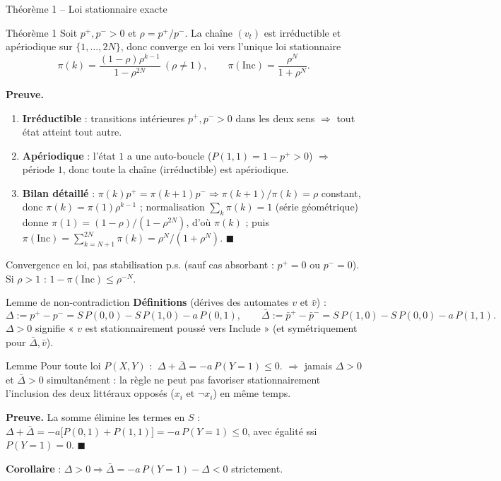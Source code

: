 \documentclass[10pt,aspectratio=169]{beamer}
\newcommand{\Inc}{\ensuremath{\mathrm{Inc}}}
\begin{document}
\begin{frame}{Théorème 1 -- Loi stationnaire exacte}
\begin{block}{Théorème 1}
\footnotesize
Soit $p^+,p^->0$ et $\rho=p^+/p^-$. La chaîne $(v_t)$ est irréductible et
apériodique sur $\{1,\ldots,2N\}$, donc converge en loi vers l'unique loi
stationnaire
\[
  \pi(k) = \frac{(1-\rho)\rho^{k-1}}{1-\rho^{2N}}\ (\rho\ne1), \qquad
  \pi(\Inc) = \frac{\rho^N}{1+\rho^N}.
\]
\end{block}
\footnotesize
\textbf{Preuve.}
\begin{enumerate}
  \item \textbf{Irréductible} : transitions intérieures $p^+,p^->0$ dans les
  deux sens $\Rightarrow$ tout état atteint tout autre.
  \item \textbf{Apériodique} : l'état $1$ a une auto-boucle
  ($P(1,1)=1-p^+>0$) $\Rightarrow$ période $1$, donc toute la chaîne
  (irréductible) est apériodique.
  \item \textbf{Bilan détaillé} : $\pi(k)p^+=\pi(k{+}1)p^-\Rightarrow
  \pi(k{+}1)/\pi(k)=\rho$ constant, donc $\pi(k)=\pi(1)\rho^{k-1}$ ;
  normalisation $\sum_k\pi(k)=1$ (série géométrique) donne
  $\pi(1)=(1-\rho)/(1-\rho^{2N})$, d'où $\pi(k)$ ; puis
  $\pi(\Inc)=\sum_{k=N+1}^{2N}\pi(k)=\rho^N/(1+\rho^N)$. $\blacksquare$
\end{enumerate}
\alert{Convergence en loi}, pas stabilisation p.s. (sauf cas absorbant :
$p^+=0$ ou $p^-=0$). Si $\rho>1$ : $1-\pi(\Inc)\le\rho^{-N}$.
\end{frame}

\begin{frame}{Lemme de non-contradiction}
\textbf{Définitions} (dérives des automates $v$ et $\bar v$) :
\[
  \Delta := p^+-p^- = S\,P(0,0)-S\,P(1,0)-a\,P(0,1), \qquad
  \bar\Delta := \bar p^+-\bar p^- = S\,P(1,0)-S\,P(0,0)-a\,P(1,1).
\]
$\Delta>0$ signifie « $v$ est stationnairement poussé vers Include » (et
symétriquement pour $\bar\Delta,\bar v$).

\begin{block}{Lemme}
Pour toute loi $P(X,Y)$ : $\ \Delta+\bar\Delta=-a\,P(Y{=}1)\le0$.
$\Rightarrow$ jamais $\Delta>0$ et $\bar\Delta>0$ simultanément : la règle
ne peut pas favoriser stationnairement l'inclusion des deux littéraux
opposés ($x_i$ et $\neg x_i$) en même temps.
\end{block}

\textbf{Preuve.} La somme élimine les termes en $S$ :
$\Delta+\bar\Delta = -a\bigl[P(0,1)+P(1,1)\bigr] = -a\,P(Y{=}1) \le 0$,
avec égalité ssi $P(Y{=}1)=0$. $\blacksquare$

\vspace{1mm}
\textbf{Corollaire} : $\Delta>0 \Rightarrow \bar\Delta=-a\,P(Y{=}1)-\Delta<0$ strictement.
\end{frame}
\end{document}
